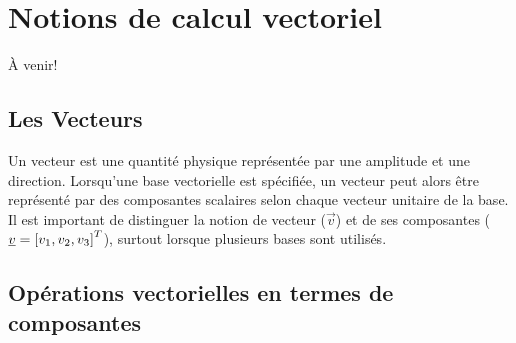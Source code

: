 \chapter{Notions de calcul vectoriel}


À venir!

\section{Les Vecteurs}
\label{sec:veccomrep}

Un vecteur est une quantité physique représentée par une amplitude et une direction. Lorsqu'une base vectorielle est spécifiée, un vecteur peut alors être représenté par des composantes scalaires selon chaque vecteur unitaire de la base. Il est important de distinguer la notion de vecteur ($\vec{v}$) et de ses composantes ($\underline{v}=\left[v_{1}, v_{2}, v_{3}\right]^T $), surtout lorsque plusieurs bases sont utilisés. 



\section{Opérations vectorielles en termes de composantes}


